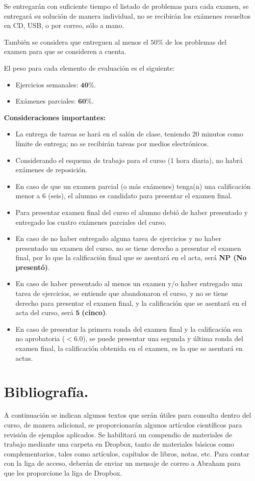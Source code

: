\documentclass[12pt]{article}
\begin{document}
Se entregarán con suficiente tiempo el listado de problemas para cada examen, se entregará su solución de manera individual, no se recibirán los exámenes resueltos en CD, USB, o por correo, sólo a mano.
\par
También se considera que entreguen al menos el $50\%$ de los problemas del examen para que se consideren a cuenta.
\par
El peso para cada elemento de evaluación es el siguiente:
\begin{itemize}
\setlength{\itemsep}{0mm}
\item Ejercicios semanales: $\mathbf{40\%}$.
\item Exámenes parciales: $\mathbf{60\%}$.
\end{itemize}
\textbf{Consideraciones importantes:}
\begin{itemize}
\setlength{\itemsep}{0mm}
\item La entrega de tareas se hará en el salón de clase, teniendo 20 minutos como límite de entrega; no se recibirán tareas por medios electrónicos.
\item Considerando el esquema de trabajo para el curso (1 hora diaria), no habrá exámenes de reposición.
\item En caso de que un examen parcial (o más exámenes) tenga(n) una calificación menor a $6$ (seis), el alumno es candidato para presentar el examen final.
\item Para presentar examen final del curso el alumno debió de haber presentado y entregado los cuatro exámenes parciales del curso.
\item En caso de no haber entregado alguna tarea de ejercicios y no haber presentado un examen del curso, no se tiene derecho a presentar el examen final, por lo que la calificación final que se asentará en el acta, será \textbf{NP (No presentó)}.
\item En caso de haber presentado al menos un examen y/o haber entregado una tarea de ejercicios, se entiende que abandonaron el curso, y no se tiene derecho para presentar el examen final, y la calificación que se asentará en el acta del curso, será $\mathbf{5}$ \textbf{(cinco)}.
\item En caso de presentar la primera ronda del examen final y la calificación sea no aprobatoria ($<6.0$), se puede presentar una segunda y última ronda del examen final, la calificación obtenida en el examen, es la que se asentará en actas.
\end{itemize}
\section{Bibliografía.}
A continuación se indican algunos textos que serán útiles para consulta dentro del curso, de manera adicional, se proporcionarán algunos artículos científicos para revisión de ejemplos aplicados. Se habilitará un compendio de materiales de trabajo mediante una carpeta en Dropbox, tanto de materiales básicos como complementarios, tales como artículos, capítulos de libros, notas, etc. Para contar con la liga de acceso, deberán de enviar un mensaje de correo a Abraham para que les proporcione la liga de Dropbox.
\end{document}
